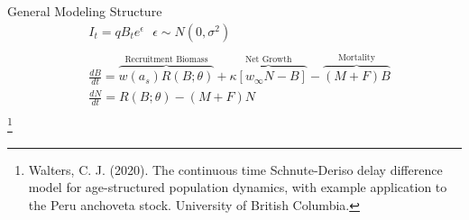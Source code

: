 \documentclass[ xcolor = pdftex, dvipsnames, table ]{beamer}
\begin{document}
%
\begin{frame}{General Modeling Structure}
\begin{align*}%
&I_t = q B_t e^\epsilon ~~~ \epsilon\sim N(0, \sigma^2)\\
&\\
&\frac{dB}{dt} = \overbrace{w(a_s)R(B;\theta)}^\text{Recruitment Biomass} + \overbrace{\kappa \left[w_\infty N-B\right]}^\text{Net Growth} - \overbrace{(M+F)B}^\text{Mortality} \\%
&\frac{dN}{dt} = R(B;\theta) - (M+F)N \\%
\end{align*}
\footnote[0]{\tiny Walters, C. J. (2020). The continuous time Schnute-Deriso delay difference model for age-structured population dynamics, with example application to the Peru anchoveta stock. University of British Columbia.}
\end{frame}
\end{document}
